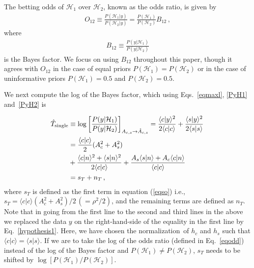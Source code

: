 \documentclass[prd,aps,floatfix,superscriptaddress,nofootinbib,twocolumn,10pt,English]{revtex4-1}
\begin{document}
The betting odds
of $\mathcal H_1$ over $\mathcal H_2$, known as the odds ratio, is given by 
\begin{align}\label{eqodd}
O_{12} \equiv \frac{P( \mathcal{H}_1 | { y})}{P( \mathcal{H}_2 | { y})} = \frac{P(\mathcal{H}_1)}{P(\mathcal{H}_2)} B_{12}\,,
\end{align}
where 
\begin{align}
\label{eq:BF}
B_{12} \equiv \frac{P(y|\mathcal H_1)}{P(y|\mathcal H_2)}
\end{align}
is the Bayes factor. We focus on using $B_{12}$ throughout this paper,
though it agrees with $O_{12}$ in the case of equal priors
$P(\mathcal{H}_1) = P(\mathcal{H}_2)$ or in the case of uninformative
priors $P(\mathcal{H}_1) = 0.5$ and $P(\mathcal{H}_2) = 0.5$.


We next compute the log of the Bayes factor, which using Eqs.~\eqref{eqmaxl}, \eqref{PyH1} and~\eqref{PyH2} is

\begin{align}
\label{eqso}
\hat{T}_{\rm single} & \equiv \log \left [ \frac{P(y|\mathcal H_1)}{P(y|\mathcal H_2)} \right ]_{A_{c,s} \rightarrow \hat{A}_{c,s} } 
=\frac{\langle c | y \rangle^2}{ 2\langle c | c \rangle}+\frac{\langle s | y \rangle^2}{ 2 \langle s | s \rangle}\, \nonumber \\
& =\frac{\langle c| c \rangle}{2} (A^2_c+A^2_s)\\
& +\frac{\langle c | n \rangle^2+\langle s | n \rangle^2}{2\langle c | c \rangle }+\frac{A_s \langle s | n \rangle+A_c \langle c | n \rangle}{\langle c | c \rangle} \nonumber \\
&=s_T+n_T\,,
\end{align}
where $s_{T}$ is defined as the first term in equation (\ref{eqso})
i.e.,~$s_{T}={\langle c| c \rangle} (A^2_c+A^2_s)/2 \, (=\rho^2/2)$, and
the remaining terms are defined as $n_{T}$.  Note that in going from
the first line to the second and third lines in the above we
replaced the data $y$ on the right-hand-side of the equality in the
first line by Eq.~\eqref{hypothesis1}. Here, we have chosen the
normalization\ of $h_c$ and $h_s$ such that $\langle c|c\rangle=
\langle s|s \rangle$. If we are to take the log of the odds ratio 
(defined in Eq.~\eqref{eqodd}) instead of the log of the Bayes factor
and $P(\mathcal{H}_1) \neq P(\mathcal{H}_2)$,
$s_T$ needs to be shifted by $\log
        [{P(\mathcal{H}_1)}/{P(\mathcal{H}_2)}]$.
\end{document}
